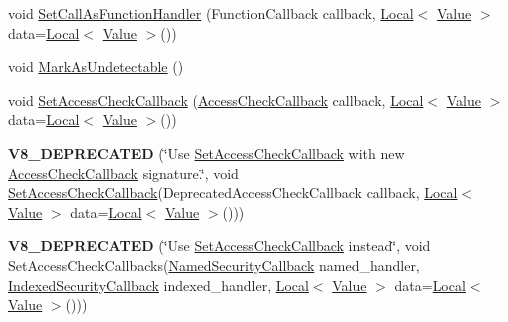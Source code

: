 \begin{DoxyCompactItemize}
\item 
void \hyperlink{classv8_1_1_object_template_a1775c8f73e643c339804d2f5b628eddf}{Set\+Call\+As\+Function\+Handler} (Function\+Callback callback, \hyperlink{classv8_1_1_local}{Local}$<$ \hyperlink{classv8_1_1_value}{Value} $>$ data=\hyperlink{classv8_1_1_local}{Local}$<$ \hyperlink{classv8_1_1_value}{Value} $>$())
\item 
void \hyperlink{classv8_1_1_object_template_a7e40ef313b44c2ad336c73051523b4f8}{Mark\+As\+Undetectable} ()
\item 
void \hyperlink{classv8_1_1_object_template_a5b0337016cd89fc72f3a9d75399c2487}{Set\+Access\+Check\+Callback} (\hyperlink{namespacev8_a1024fb358d107c1494163217830688e6}{Access\+Check\+Callback} callback, \hyperlink{classv8_1_1_local}{Local}$<$ \hyperlink{classv8_1_1_value}{Value} $>$ data=\hyperlink{classv8_1_1_local}{Local}$<$ \hyperlink{classv8_1_1_value}{Value} $>$())
\item 
{\bfseries V8\+\_\+\+D\+E\+P\+R\+E\+C\+A\+T\+ED} (\char`\"{}Use \hyperlink{classv8_1_1_object_template_a5b0337016cd89fc72f3a9d75399c2487}{Set\+Access\+Check\+Callback} with new \hyperlink{namespacev8_a1024fb358d107c1494163217830688e6}{Access\+Check\+Callback} signature.\char`\"{}, void \hyperlink{classv8_1_1_object_template_a5b0337016cd89fc72f3a9d75399c2487}{Set\+Access\+Check\+Callback}(Deprecated\+Access\+Check\+Callback callback,                                                                                                                               \hyperlink{classv8_1_1_local}{Local}$<$ \hyperlink{classv8_1_1_value}{Value} $>$ data=\hyperlink{classv8_1_1_local}{Local}$<$ \hyperlink{classv8_1_1_value}{Value} $>$()))\hypertarget{classv8_1_1_object_template_a816e285cb9f2a23b15bf7a718bc6a7fa}{}\label{classv8_1_1_object_template_a816e285cb9f2a23b15bf7a718bc6a7fa}

\item 
{\bfseries V8\+\_\+\+D\+E\+P\+R\+E\+C\+A\+T\+ED} (\char`\"{}Use \hyperlink{classv8_1_1_object_template_a5b0337016cd89fc72f3a9d75399c2487}{Set\+Access\+Check\+Callback} instead\char`\"{}, void Set\+Access\+Check\+Callbacks(\hyperlink{namespacev8_ab5cafda0c556bba990c660ce9c904e0d}{Named\+Security\+Callback} named\+\_\+handler,                                                                                                                                   \hyperlink{namespacev8_aebbcc7837753e51112d944ad96520da1}{Indexed\+Security\+Callback} indexed\+\_\+handler,                                                                                                                                   \hyperlink{classv8_1_1_local}{Local}$<$ \hyperlink{classv8_1_1_value}{Value} $>$ data=\hyperlink{classv8_1_1_local}{Local}$<$ \hyperlink{classv8_1_1_value}{Value} $>$()))\hypertarget{classv8_1_1_object_template_a1b3293962bb1685f127a58ab3ef3d29d}{}\label{classv8_1_1_object_template_a1b3293962bb1685f127a58ab3ef3d29d}


\end{DoxyCompactItemize}
